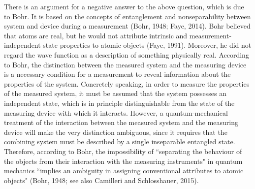 There is an argument for a negative answer to the above question, which is due to Bohr. It is based on the concepts of entanglement and nonseparability between system and device during a measurement (Bohr, 1948; Faye, 2014). Bohr believed that atoms are real, but he would not attribute intrinsic and measurement-independent state properties to atomic objects (Faye, 1991). Moreover, he did not regard the wave function as a description of something physically real. According to Bohr, the distinction between the measured system and the measuring device is a necessary condition for a measurement to reveal information about the properties of the system. Concretely speaking, in order to measure the properties of the measured system, it must be assumed that the system possesses an independent state, which is in principle distinguishable from the state of the measuring device with which it interacts. However, a quantum-mechanical treatment of the interaction between the measured system and the measuring device will make the very distinction ambiguous, since it requires that the combining system must be described by a single inseparable entangled state. Therefore, according to Bohr, the impossibility of ``separating the behaviour of the objects from their interaction with the measuring instruments" in quantum mechanics ``implies an ambiguity in assigning conventional attributes to atomic objects" (Bohr, 1948; see also Camilleri and Schlosshauer, 2015). 


